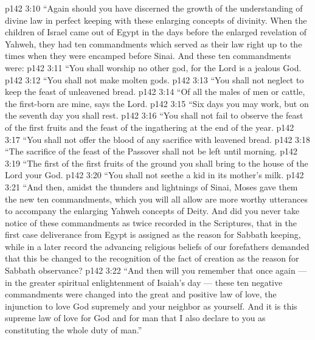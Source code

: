 \vs p142 3:10 \textcolor{ubdarkred}{“Again should you have discerned the growth of the understanding of divine law in perfect keeping with these enlarging concepts of divinity. When the children of Israel came out of Egypt in the days before the enlarged revelation of Yahweh, they had ten commandments which served as their law right up to the times when they were encamped before Sinai. And these ten commandments were:}
\vs p142 3:11 \textcolor{ubdarkred}{“\bibnobreakspace You shall worship no other god, for the Lord is a jealous God.}
\vs p142 3:12 \textcolor{ubdarkred}{“\bibnobreakspace You shall not make molten gods.}
\vs p142 3:13 \textcolor{ubdarkred}{“\bibnobreakspace You shall not neglect to keep the feast of unleavened bread.}
\vs p142 3:14 \textcolor{ubdarkred}{“\bibnobreakspace Of all the males of men or cattle, the first\hyp{}born are mine, says the Lord.}
\vs p142 3:15 \textcolor{ubdarkred}{“\bibnobreakspace Six days you may work, but on the seventh day you shall rest.}
\vs p142 3:16 \textcolor{ubdarkred}{“\bibnobreakspace You shall not fail to observe the feast of the first fruits and the feast of the ingathering at the end of the year.}
\vs p142 3:17 \textcolor{ubdarkred}{“\bibnobreakspace You shall not offer the blood of any sacrifice with leavened bread.}
\vs p142 3:18 \textcolor{ubdarkred}{“\bibnobreakspace The sacrifice of the feast of the Passover shall not be left until morning.}
\vs p142 3:19 \textcolor{ubdarkred}{“\bibnobreakspace The first of the first fruits of the ground you shall bring to the house of the Lord your God.}
\vs p142 3:20 \textcolor{ubdarkred}{“\bibnobreakspace You shall not seethe a kid in its mother’s milk.}
\vs p142 3:21 \pc \textcolor{ubdarkred}{“And then, amidst the thunders and lightnings of Sinai, Moses gave them the new ten commandments, which you will all allow are more worthy utterances to accompany the enlarging Yahweh concepts of Deity. And did you never take notice of these commandments as twice recorded in the Scriptures, that in the first case deliverance from Egypt is assigned as the reason for Sabbath keeping, while in a later record the advancing religious beliefs of our forefathers demanded that this be changed to the recognition of the fact of creation as the reason for Sabbath observance?}
\vs p142 3:22 \textcolor{ubdarkred}{“And then will you remember that once again --- in the greater spiritual enlightenment of Isaiah’s day --- these ten negative commandments were changed into the great and positive law of love, the injunction to love God supremely and your neighbor as yourself. And it is this supreme law of love for God and for man that I also declare to you as constituting the whole duty of man.”}
